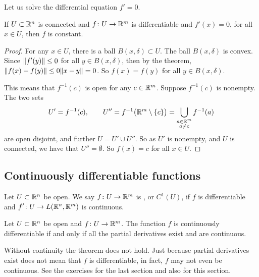 Let us solve the differential equation $f' = 0$.

\begin{cor}
If $U \subset {\mathbb{R}}^n$ is connected and $f \colon U \to {\mathbb{R}}^m$ is differentiable
and $f'(x) = 0$, for all $x \in U$, then $f$ is constant.
\end{cor}

\begin{proof}
For any $x \in U$, there is a ball $B(x,\delta) \subset U$.  The ball
$B(x,\delta)$ is convex.  Since
$\lVert {f'(y)} \rVert \leq 0$ for all $y \in B(x,\delta)$, then by the theorem,
$\lVert {f(x)-f(y)} \rVert \leq 0 \lVert {x-y} \rVert = 0$.  So $f(x) = f(y)$ for all $y \in
B(x,\delta)$.

This means that $f^{-1}(c)$ is open for any $c \in {\mathbb{R}}^m$.  Suppose
$f^{-1}(c)$ is nonempty.  
The two sets
\begin{equation*}
U' = f^{-1}(c), \qquad U'' = f^{-1}\bigl({\mathbb{R}}^m\setminus\{c\}\bigr) =
\bigcup_{\substack{a \in {\mathbb{R}}^m\\a\neq c}} f^{-1}(a)
\end{equation*}
are open disjoint, and further $U = U' \cup U''$.  So as $U'$ is nonempty,
and $U$ is connected,
we have that $U'' = \emptyset$.  So $f(x) = c$ for all $x \in U$.
\end{proof}

\subsection{Continuously differentiable functions}

\begin{defn}
Let $U \subset {\mathbb{R}}^n$ be open.
We say $f \colon U \to {\mathbb{R}}^m$ is
\emph{},
or $C^1(U)$,
if $f$ is differentiable and $f' \colon U \to L({\mathbb{R}}^n,{\mathbb{R}}^m)$
is continuous.
\end{defn}

\begin{prop} \label{mv:prop:contdiffpartials}
Let $U \subset {\mathbb{R}}^n$ be open and
$f \colon U \to {\mathbb{R}}^m$.  The function
$f$ is continuously differentiable if and only if all
the partial derivatives exist and are continuous.
\end{prop}

Without continuity the theorem does not hold.  Just because
partial derivatives exist does not mean that $f$ is differentiable,
in fact, $f$ may not even be continuous.  See the exercises
for the last section and also for this section.

